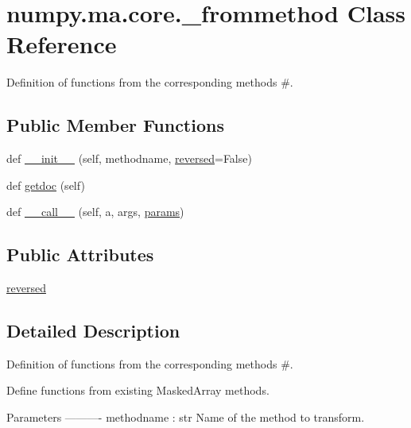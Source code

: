 \hypertarget{classnumpy_1_1ma_1_1core_1_1__frommethod}{}\section{numpy.\+ma.\+core.\+\_\+frommethod Class Reference}
\label{classnumpy_1_1ma_1_1core_1_1__frommethod}


Definition of functions from the corresponding methods \#.  


\subsection*{Public Member Functions}
\begin{DoxyCompactItemize}
\item 
def \hyperlink{classnumpy_1_1ma_1_1core_1_1__frommethod_aeb0d9fb36a3d8045c94e3f73dc4ff0ba}{\+\_\+\+\_\+init\+\_\+\+\_\+} (self, methodname, \hyperlink{classnumpy_1_1ma_1_1core_1_1__frommethod_abb6a18fdf77efa92a6d1e6a087dd3e52}{reversed}=False)
\item 
def \hyperlink{classnumpy_1_1ma_1_1core_1_1__frommethod_a86a72e0184fe7285abc1be435b07ffd9}{getdoc} (self)
\item 
def \hyperlink{classnumpy_1_1ma_1_1core_1_1__frommethod_ad111acc75295953416d78dd5bf3a96ed}{\+\_\+\+\_\+call\+\_\+\+\_\+} (self, a, args, \hyperlink{namespacenumpy_1_1ma_1_1core_af2219f7433d2b3f0adc0670dc93c9fd1}{params})
\end{DoxyCompactItemize}
\subsection*{Public Attributes}
\begin{DoxyCompactItemize}
\item 
\hyperlink{classnumpy_1_1ma_1_1core_1_1__frommethod_abb6a18fdf77efa92a6d1e6a087dd3e52}{reversed}
\end{DoxyCompactItemize}


\subsection{Detailed Description}
Definition of functions from the corresponding methods \#. 

\begin{DoxyVerb}Define functions from existing MaskedArray methods.

Parameters
----------
methodname : str
    Name of the method to transform.\end{DoxyVerb}
 

